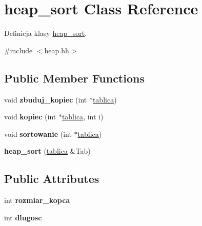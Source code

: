\hypertarget{classheap__sort}{\section{heap\-\_\-sort \-Class \-Reference}
\label{classheap__sort}
}


\-Definicja klasy \hyperlink{classheap__sort}{heap\-\_\-sort}.  




{\ttfamily \#include $<$heap.\-hh$>$}

\subsection*{\-Public \-Member \-Functions}
\begin{DoxyCompactItemize}
\item 
\hypertarget{classheap__sort_ae826e1517bb724c1c79d36d472091b35}{void {\bfseries zbuduj\-\_\-kopiec} (int $\ast$\hyperlink{classtablica}{tablica})}\label{classheap__sort_ae826e1517bb724c1c79d36d472091b35}

\item 
\hypertarget{classheap__sort_a3e59227f0a2291722efe10ca6ee5d88f}{void {\bfseries kopiec} (int $\ast$\hyperlink{classtablica}{tablica}, int i)}\label{classheap__sort_a3e59227f0a2291722efe10ca6ee5d88f}

\item 
\hypertarget{classheap__sort_ad922793ded8fbbe1e24548eee279c8eb}{void {\bfseries sortowanie} (int $\ast$\hyperlink{classtablica}{tablica})}\label{classheap__sort_ad922793ded8fbbe1e24548eee279c8eb}

\item 
\hypertarget{classheap__sort_a90449681f2f8116daea9354e75cfd15c}{{\bfseries heap\-\_\-sort} (\hyperlink{classtablica}{tablica} \&\-Tab)}\label{classheap__sort_a90449681f2f8116daea9354e75cfd15c}

\end{DoxyCompactItemize}
\subsection*{\-Public \-Attributes}
\begin{DoxyCompactItemize}
\item 
\hypertarget{classheap__sort_aae7aee6e9fb53c978840494dcb8d6f52}{int {\bfseries rozmiar\-\_\-kopca}}\label{classheap__sort_aae7aee6e9fb53c978840494dcb8d6f52}

\item 
\hypertarget{classheap__sort_a9f8c6051a440a6817c86de78808396e1}{int {\bfseries dlugosc}}\label{classheap__sort_a9f8c6051a440a6817c86de78808396e1}

\end{DoxyCompactItemize}


